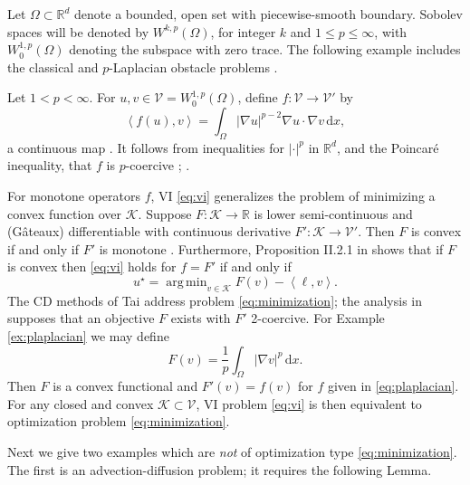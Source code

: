 \documentclass[review,hidelinks,onefignum,onetabnum]{siamart220329}
\newcommand{\RR}{\mathbb{R}}
\newcommand{\grad}{\nabla}
\newcommand{\cK}{\mathcal{K}}
\newcommand{\cV}{\mathcal{V}}
\newcommand{\ip}[2]{\left<#1,#2\right>}
\newcommand{\dx}{\, \mathrm{d}x}
\DeclareMathOperator*{\argmin}{arg\,min}
\begin{document}
Let $\Omega \subset \RR^d$ denote a bounded, open set with piecewise-smooth boundary.  Sobolev spaces \cite{Evans2010} will be denoted by $W^{k,p}(\Omega)$, for integer $k$ and $1\le p \le \infty$, with $W^{1,p}_0(\Omega)$ denoting the subspace with zero trace.  The following example includes the classical and $p$-Laplacian obstacle problems \cite{ChoeLewis1991}.

\begin{example}  \label{ex:plaplacian}  Let $1<p<\infty$.  For $u,v \in \cV = W^{1,p}_0(\Omega)$, define $f:\cV \to \cV'$ by
\begin{equation}
\ip{f(u)}{v} = \int_\Omega |\grad u|^{p-2} \grad u \cdot \grad v\dx, \label{eq:plaplacian}
\end{equation}
a continuous map \cite[Theorem A.0.6]{Peral1997}.  It follows from inequalities for $|\cdot|^p$ in $\RR^d$, and the Poincar\'e inequality, that $f$ is $p$-coercive \cite{ChoeLewis1991}; \cite[Appendix A]{Bueler2021conservation}.  \end{example}

For monotone operators $f$, VI \eqref{eq:vi} generalizes the problem of minimizing a convex function over $\cK$.  Suppose $F:\cK \to \RR$ is lower semi-continuous and (G\^ateaux) differentiable with continuous derivative $F':\cK \to \cV'$.  Then $F$ is convex if and only if $F'$ is monotone \cite[Proposition I.5.5]{EkelandTemam1976}.  Furthermore, Proposition II.2.1 in \cite{EkelandTemam1976} shows that if $F$ is convex then \eqref{eq:vi} holds for $f=F'$ if and only if
\begin{equation}
u^\star = \argmin_{v\in\cK} F(v) - \ip{\ell}{v}. \label{eq:minimization}
\end{equation}
The CD methods of Tai \cite{Tai2003} address problem \eqref{eq:minimization}; the analysis in \cite{Tai2003} supposes that an objective $F$ exists with $F'$ 2-coercive.  For Example \ref{ex:plaplacian} we may define
\begin{equation}
F(v) = \frac{1}{p} \int_\Omega |\grad v|^p\dx. \label{eq:plaplacianobjective}
\end{equation}
Then $F$ is a convex functional and $F'(v) = f(v)$ for $f$ given in \eqref{eq:plaplacian}.  For any closed and convex $\cK\subset \cV$, VI problem \eqref{eq:vi} is then equivalent to optimization problem \eqref{eq:minimization}.

Next we give two examples which are \emph{not} of optimization type \eqref{eq:minimization}.  The first is an advection-diffusion problem; it requires the following Lemma.
\end{document}
